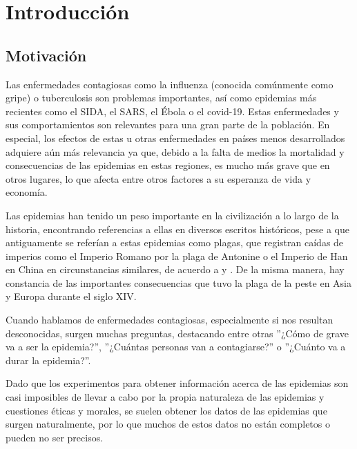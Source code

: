 
\chapter{Introducción}

\section{Motivación}

Las enfermedades contagiosas como la influenza (conocida comúnmente como gripe) o tuberculosis son problemas importantes, así como epidemias más recientes como el SIDA, el SARS, el Ébola o el covid-19. Estas enfermedades y sus comportamientos son relevantes para una gran parte de la población. En especial, los efectos de estas u otras enfermedades en países menos desarrollados adquiere aún más relevancia ya que, debido a la falta de medios la mortalidad y consecuencias de las epidemias en estas regiones, es mucho más grave que en otros lugares, lo que afecta entre otros factores a su esperanza de vida y economía.

Las epidemias han tenido un peso importante en la civilización a lo largo de la historia, encontrando referencias a ellas en diversos escritos históricos, pese a que antiguamente se referían a estas epidemias como plagas, que registran caídas de imperios como el Imperio Romano por la plaga de Antonine o el Imperio de Han en China en circunstancias similares, de acuerdo a \cite{Sommerfeld2003} y \cite{duncan-jones_1996}. De la misma manera, hay constancia de las importantes consecuencias que tuvo la plaga de la peste en Asia y Europa durante el siglo XIV.

Cuando hablamos de enfermedades contagiosas, especialmente si nos resultan desconocidas, surgen muchas preguntas, destacando entre otras ''¿Cómo de grave va a ser la epidemia?'', ''¿Cuántas personas van a contagiarse?'' o ''¿Cuánto va a durar la epidemia?''.

Dado que los experimentos para obtener información acerca de las epidemias son casi imposibles de llevar a cabo por la propia naturaleza de las epidemias y cuestiones éticas y morales, se suelen obtener los datos de las epidemias que surgen naturalmente, por lo que muchos de estos datos no están completos o pueden no ser precisos.

